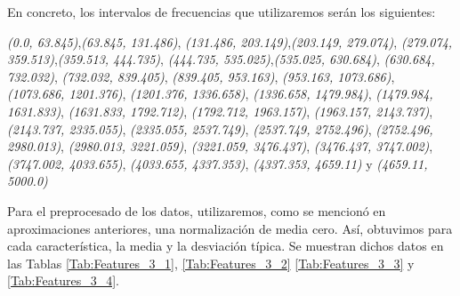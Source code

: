 \documentclass[12pt]{article}
\begin{document}
\newpage
En concreto, los intervalos de frecuencias que utilizaremos serán los siguientes:

\textit{(0.0, 63.845)},\textit{(63.845, 131.486)}, 
\textit{(131.486, 203.149)},\textit{(203.149, 279.074)}, 
\textit{(279.074, 359.513)},\textit{(359.513, 444.735)}, 
\textit{(444.735, 535.025)},\textit{(535.025, 630.684)}, 
\textit{(630.684, 732.032)}, \textit{(732.032, 839.405)},
\textit{(839.405, 953.163)}, \textit{(953.163, 1073.686)},
\textit{(1073.686, 1201.376)}, \textit{(1201.376, 1336.658)}, 
\textit{(1336.658, 1479.984)}, \textit{(1479.984, 1631.833)},
\textit{(1631.833, 1792.712)}, \textit{(1792.712, 1963.157)},
\textit{(1963.157, 2143.737)}, \textit{(2143.737, 2335.055)}, 
\textit{(2335.055, 2537.749)}, \textit{(2537.749, 2752.496)}, 
\textit{(2752.496, 2980.013)}, \textit{(2980.013, 3221.059)}, 
\textit{(3221.059, 3476.437)}, \textit{(3476.437, 3747.002)},
\textit{(3747.002, 4033.655)}, \textit{(4033.655, 4337.353)},
\textit{(4337.353, 4659.11)} y \textit{(4659.11, 5000.0)}

Para el preprocesado de los datos, utilizaremos, como se mencionó en aproximaciones anteriores,
una normalización de media cero.
Así, obtuvimos para cada característica, la media y la desviación típica. Se muestran dichos datos en las Tablas \ref{Tab:Features_3_1},
\ref{Tab:Features_3_2} \ref{Tab:Features_3_3} y \ref{Tab:Features_3_4}.
\end{document}
